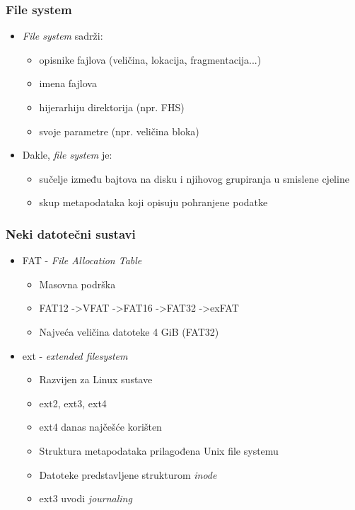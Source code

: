 \documentclass[t]{beamer}
\begin{document}
\begin{frame}
	\frametitle{File system}
	\begin{itemize}
		\item \textit{File system} sadrži:
		\begin{itemize}
			\item opisnike fajlova (veličina, lokacija, fragmentacija...)
			\item imena fajlova
			\item hijerarhiju direktorija (npr. FHS)
			\item svoje parametre (npr. veličina bloka)
		\end{itemize}
		\vfill
	    \item Dakle, \textit{file system} je:
	    \begin{itemize}
	    	\item sučelje između bajtova na disku i njihovog grupiranja u smislene cjeline
	    	\item skup metapodataka koji opisuju pohranjene podatke
	    \end{itemize}
    \end{itemize}
\end{frame}




\begin{frame}
	\frametitle{Neki datotečni sustavi}
	\begin{itemize}
		\item FAT - \emph{File Allocation Table}\
		\begin{itemize}
			\item Masovna podrška
			\item FAT12 -\textgreater VFAT -\textgreater FAT16 -\textgreater FAT32 -\textgreater exFAT
			\item Najveća veličina datoteke 4 GiB (FAT32)
		\end{itemize}
		\item ext - \emph{extended filesystem}
		\begin{itemize}
			\item Razvijen za Linux sustave
			\item ext2, ext3, ext4
			\item ext4 danas najčešće korišten
			\item Struktura metapodataka prilagođena Unix file systemu	
			\item Datoteke predstavljene strukturom \emph{inode}
			\item ext3 uvodi \emph{journaling}
		\end{itemize}
	\end{itemize}
\end{frame}
\end{document}
